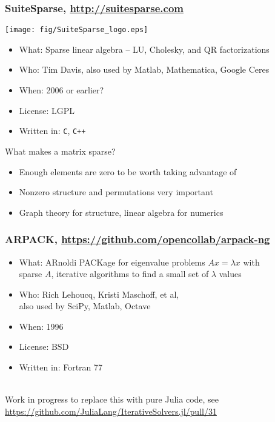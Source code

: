 \documentclass[compressed,dvips,letter]{beamer}
\begin{document}
%
%

\begin{frame}\frametitle{SuiteSparse, \url{http://suitesparse.com}}

\vspace{-5pt}
\begin{center}
\texttt{[image: fig/SuiteSparse\_logo.eps]}
\end{center}
\vspace{-15pt}
\begin{itemize}
\item What: Sparse linear algebra -- LU, Cholesky, and QR factorizations
\item Who: Tim Davis, also used by Matlab, Mathematica, Google Ceres
\item When: 2006 or earlier?
\item License: LGPL
\item Written in: \texttt{C}, \texttt{C++}
\end{itemize}

What makes a matrix sparse?
\begin{itemize}
\item Enough elements are zero to be worth taking advantage of
\item Nonzero structure and permutations very important
\item Graph theory for structure, linear algebra for numerics
\end{itemize}

\end{frame}

%
%

\begin{frame}\frametitle{ARPACK, {\small \url{https://github.com/opencollab/arpack-ng}}}
\begin{itemize}
\item What: ARnoldi PACKage for eigenvalue problems $A x = \lambda x$ with \\
sparse $A$, iterative algorithms to find a small set of $\lambda$ values
\item Who: Rich Lehoucq, Kristi Maschoff, et al, \\
also used by SciPy, Matlab, Octave
\item When: 1996
\item License: BSD
\item Written in: Fortran 77
\end{itemize}

~\\
Work in progress to replace this with pure Julia code, see \url{https://github.com/JuliaLang/IterativeSolvers.jl/pull/31}

\end{frame}
\end{document}
